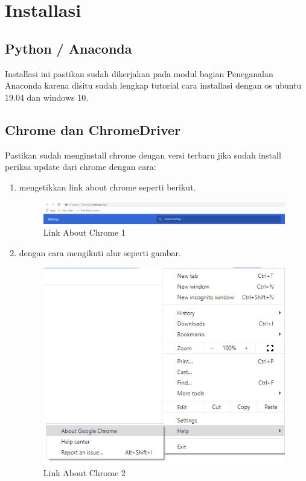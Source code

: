 \section{Installasi}

\subsection{Python / Anaconda}
Installasi ini pastikan sudah dikerjakan pada modul bagian Peneganalan Anaconda karena disitu sudah lengkap tutorial cara installasi dengan os ubuntu 19.04 dan windows 10.

\subsection{Chrome dan ChromeDriver}
Pastikan sudah menginstall chrome dengan versi terbaru jika sudah install periksa update dari chrome dengan cara:
\begin{enumerate}
\item mengetikkan link about chrome seperti berikut.

\begin{figure}[H]
\centerline{\includegraphics[scale=0.5]{figures/linkupdatechrome}}
\caption{Link About Chrome 1}
\label{linkupdatechrome}
\end{figure}

\item dengan cara mengikuti alur seperti gambar.
\begin{figure}[H]
\centerline{\includegraphics[scale=0.75]{figures/updatechrome}}
\caption{Link About Chrome 2}
\label{alurabout}
\end{figure}
\end{enumerate}


